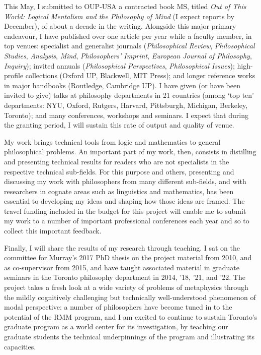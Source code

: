 \documentclass[12pt]{article}
\begin{document}
This May, I submitted to OUP-USA a contracted book MS, titled \emph{Out of This World: Logical Mentalism and the Philosophy of Mind} (I expect reports by December), of about a decade in the writing. Alongside this major primary endeavour, I have published over one article per year while a faculty member, in top venues: specialist and generalist journals (\emph{Philosophical Review}, \emph{Philosophical Studies}, \emph{Analysis}, \emph{Mind}, \emph{Philosophers' Imprint}, \emph{European Journal of Philosophy}, \emph{Inquiry});  invited annuals (\emph{Philosophical Perspectives}, \emph{Philosophical Issues}); high-profile collections (Oxford UP, Blackwell, MIT Press); and longer reference works in major handbooks (Routledge, Cambridge UP). I have given (or have been invited to give) talks at philosophy departments in 21 countries (among `top ten' departments: NYU, Oxford, Rutgers, Harvard, Pittsburgh, Michigan, Berkeley, Toronto); and many conferences, workshops and seminars. I expect that during the granting period, I will sustain this rate of output and quality of venue.

My work brings technical tools from logic and mathematics to general philosophical problems. An important part of my work, then, consists in distilling and presenting technical results for readers who are not specialists in the respective technical sub-fields. For this purpose and others, presenting and discussing my work with philosophers from many different sub-fields, and with researchers in cognate areas such as linguistics and mathematics, has been essential to developing my ideas and shaping how those ideas are framed. The travel funding included in the budget for this project will enable me to submit my work to a number of important professional conferences each year and so to collect this important feedback.

Finally, I will share the results of my research through teaching. I sat on the committee for Murray's 2017 PhD thesis on the project material from 2010, and as co-supervisor from 2015, and have taught associated material in graduate seminars in the Toronto philosophy department in 2014, '18, '21, and '22. The project takes a fresh look at a wide variety of problems of metaphysics through the mildly cognitively challenging but technically well-understood phenomenon of modal perspective: a number of philosophers have become tuned in to the potential of the RMM program, and I am excited to continue to sustain Toronto's graduate program as a world center for its investigation, by teaching our graduate students the technical underpinnings of the program and illustrating its capacities.
\end{document}
